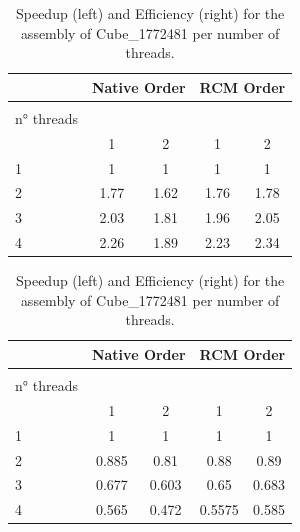 \documentclass[hidelinks]{article}
\begin{document}
\begin{table}[H]
    \begin{tabular}{ l  c c c c }
        \toprule
        & \multicolumn{2}{c}{Native Order} & \multicolumn{2}{c}{RCM Order} \\ \midrule
        \begin{minipage}[t][.75cm][t]{1.75cm}
        \raggedleft method \\
        \raggedright n° threads \\
        \end{minipage} & 1 & 2 		& 1 & 2 		\\ \midrule
        1  & 1    &    1 &    1 & 1     \\ 
        2  & 1.77 & 1.62 & 1.76 & 1.78   \\
        3  & 2.03 & 1.81 & 1.96 & 2.05   \\
        4  & 2.26 & 1.89 & 2.23 & 2.34   \\ \bottomrule
    \end{tabular}
    \hfill 
    \begin{tabular}{ l  c c c c }
        \toprule
        & \multicolumn{2}{c}{Native Order} & \multicolumn{2}{c}{RCM Order} \\ \midrule
        \begin{minipage}[t][.75cm][t]{1.75cm}
        \raggedleft method \\
        \raggedright n° threads \\
        \end{minipage} & 1 & 2 		& 1 & 2 		\\ \midrule
        1  & 1 & 1 & 1 & 1   \\ 
        2  & 0.885 & 0.81 & 0.88 & 0.89   \\
        3  & 0.677 & 0.603 & 0.65 & 0.683   \\
        4  & 0.565 & 0.472 & 0.5575 & 0.585   \\ \bottomrule
    \end{tabular}

    \caption{Speedup (left) and Efficiency (right) for the assembly of Cube\_1772481 per number of threads.}\label{tab:assemblyspeedups}
\end{table}
\end{document}
